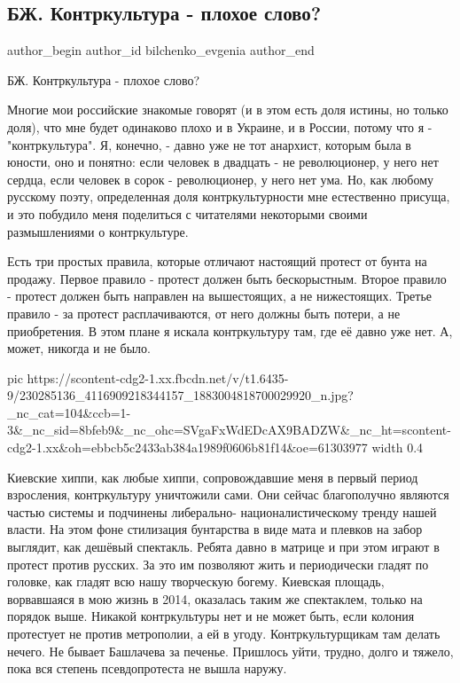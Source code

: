  
 
 
 
 
 
\subsection{БЖ. Контркультура - плохое слово?}
\label{sec:02_08_2021.fb.bilchenko_evgenia.5.kontr_kultura}
 
\ifcmt
 author_begin
   author_id bilchenko_evgenia
 author_end
\fi

БЖ. Контркультура - плохое слово?

Многие мои российские знакомые говорят (и в этом есть доля истины, но только
доля), что мне будет одинаково плохо и в Украине, и в России, потому что я -
"контркультура". Я, конечно, - давно уже не тот анархист, которым была в
юности, оно и понятно: если человек в двадцать - не революционер, у него нет
сердца, если человек в сорок - революционер, у него нет ума. Но, как любому
русскому поэту, определенная доля контркультурности мне естественно присуща, и
это побудило меня поделиться с читателями некоторыми своими размышлениями о
контркультуре.

Есть три простых правила, которые отличают настоящий протест от бунта на
продажу. Первое правило - протест должен быть бескорыстным. Второе правило -
протест должен быть направлен на вышестоящих, а не нижестоящих. Третье правило
- за протест расплачиваются, от него должны быть потери, а не приобретения. В
этом плане я искала контркультуру там, где её давно уже нет. А, может, никогда
и не было. 

\ifcmt
  pic https://scontent-cdg2-1.xx.fbcdn.net/v/t1.6435-9/230285136_4116909218344157_1883004818700029920_n.jpg?_nc_cat=104&ccb=1-3&_nc_sid=8bfeb9&_nc_ohc=SVgaFxWdEDcAX9BADZW&_nc_ht=scontent-cdg2-1.xx&oh=ebbcb5c2433ab384a1989f0606b81f14&oe=61303977
  width 0.4
\fi

Киевские хиппи, как любые хиппи, сопровождавшие меня в первый период
взросления, контркультуру уничтожили сами. Они сейчас благополучно являются
частью системы и подчинены либерально- националистическому тренду нашей власти.
На этом фоне стилизация бунтарства в виде мата и плевков на забор выглядит, как
дешёвый спектакль. Ребята давно в матрице и при этом играют в протест против
русских. За это им позволяют жить и периодически гладят по головке, как гладят
всю нашу творческую богему. Киевская площадь, ворвавшаяся в мою жизнь в 2014,
оказалась таким же спектаклем, только на порядок выше. Никакой контркультуры
нет и не может быть, если колония протестует не против метрополии, а ей в
угоду. Контркультурщикам там делать нечего. Не бывает Башлачева за печенье.
Пришлось уйти, трудно, долго и тяжело, пока вся степень псевдопротеста не вышла
наружу.

